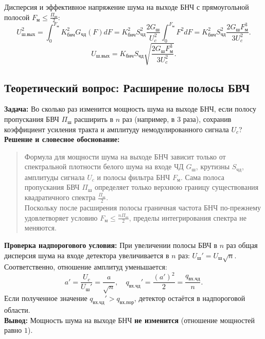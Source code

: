 \documentclass[12pt,a4paper]{article}
\begin{document}
Дисперсия и эффективное напряжение шума на выходе БНЧ с прямоугольной полосой $F_{\text{м}} \le \frac{\Pi_{\text{ш}}}{2}$:
\begin{equation}
U_{\text{ш.вых}}^2 = \int_0^{F_{\text{м}}} K_{\text{бнч}}^2 G_{\text{чд}}(F) dF = K_{\text{бнч}}^2 S_{\text{чд}}^2 \frac{2 G_{\text{ш}}}{U_c^2} \int_0^{F_{\text{м}}} F^2 dF = K_{\text{бнч}}^2 S_{\text{чд}}^2 \frac{2 G_{\text{ш}} F_{\text{м}}^3}{3 U_c^2}.
\end{equation}
\begin{equation}
U_{\text{ш.вых}} = K_{\text{бнч}} S_{\text{чд}} \sqrt{\frac{2 G_{\text{ш}} F_{\text{м}}^3}{3 U_c^2}}.
\end{equation}

\subsection{Теоретический вопрос: Расширение полосы БВЧ}
\textbf{Задача:} Во сколько раз изменится мощность шума на выходе БНЧ, если полосу пропускания БВЧ $\Pi_{\text{ш}}$ расширить в $n$ раз (например, в $3$ раза), сохранив коэффициент усиления тракта и амплитуду немодулированного сигнала $U_c$?\\
\textbf{Решение и словесное обоснование:}
\begin{quote}
Формула для мощности шума на выходе БНЧ зависит только от спектральной плотности белого шума на входе ЧД $G_{\text{ш}}$, крутизны $S_{\text{чд}}$, амплитуды сигнала $U_c$ и полосы фильтра БНЧ $F_{\text{м}}$. Сама полоса пропускания БВЧ $\Pi_{\text{ш}}$ определяет только верхнюю границу существования квадратичного спектра $\frac{\Pi_{\text{ш}}}{2}$.\\
Поскольку после расширения полосы граничная частота БНЧ по-прежнему удовлетворяет условию $F_{\text{м}} \le \frac{n \Pi_{\text{ш}}}{2}$, пределы интегрирования спектра не меняются.
\end{quote}
\textbf{Проверка надпорогового условия:}
При увеличении полосы БВЧ в $n$ раз общая дисперсия шума на входе детектора увеличивается в $n$ раз: $U_{\text{ш}}' = U_{\text{ш}} \sqrt{n}$.
Соответственно, отношение амплитуд уменьшается:
\begin{equation}
a' = \frac{U_c}{U_{\text{ш}}'} = \frac{a}{\sqrt{n}}, \quad q_{\text{вх.чд}}' = \frac{(a')^2}{2} = \frac{q_{\text{вх.чд}}}{n}.
\end{equation}
Если полученное значение $q_{\text{вх.чд}}' > q_{\text{вх.пор}}$, детектор остаётся в надпороговой области.\\
\textbf{Вывод:} Мощность шума на выходе БНЧ \textbf{не изменится} (отношение мощностей равно $1$).
\end{document}
